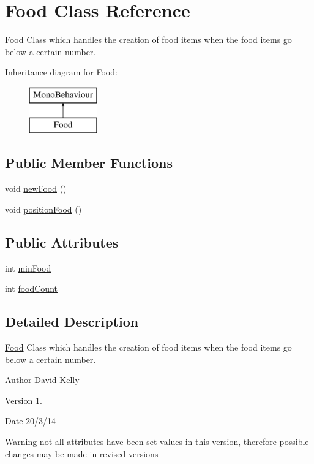 \hypertarget{class_food}{\section{Food Class Reference}
\label{class_food}
}


\hyperlink{class_food}{Food} Class which handles the creation of food items when the food items go below a certain number.  


Inheritance diagram for Food\-:\begin{figure}[H]
\begin{center}
\leavevmode
\includegraphics[height=2.000000cm]{class_food}
\end{center}
\end{figure}
\subsection*{Public Member Functions}
\begin{DoxyCompactItemize}
\item 
void \hyperlink{class_food_a70fa48f4f8b75a8cc25072ef0d83189b}{new\-Food} ()
\item 
void \hyperlink{class_food_aa665475b1d8fea6986ee3744f934c77a}{position\-Food} ()
\end{DoxyCompactItemize}
\subsection*{Public Attributes}
\begin{DoxyCompactItemize}
\item 
int \hyperlink{class_food_a5bd560d6c7386e3fa786884652528008}{min\-Food}
\item 
int \hyperlink{class_food_abb901fd4d5d3151687c1ea9fd7f64709}{food\-Count}
\end{DoxyCompactItemize}


\subsection{Detailed Description}
\hyperlink{class_food}{Food} Class which handles the creation of food items when the food items go below a certain number. 

\begin{DoxyAuthor}{Author}
David Kelly 
\end{DoxyAuthor}
\begin{DoxyVersion}{Version}
1. 
\end{DoxyVersion}
\begin{DoxyDate}{Date}
20/3/14
\end{DoxyDate}
\begin{DoxyWarning}{Warning}
not all attributes have been set values in this version, therefore possible changes may be made in revised versions 
\end{DoxyWarning}


